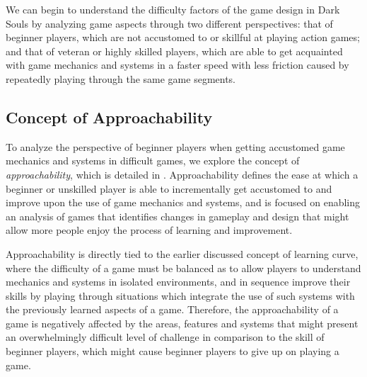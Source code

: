 We can begin to understand the difficulty factors of the game design in Dark Souls by analyzing game aspects through two different perspectives: that of beginner players, which are not accustomed to or skillful at playing action games; and that of veteran or highly skilled players, which are able to get acquainted with game mechanics and systems in a faster speed with less friction caused by repeatedly playing through the same game segments.

\subsection{Concept of Approachability}

To analyze the perspective of beginner players when getting accustomed game mechanics and systems in difficult games, we explore the concept of \emph{approachability}, which is detailed in \cite{ONLINE_AcessibilityInGameDesign}. Approachability defines the ease at which a beginner or unskilled player is able to incrementally get accustomed to and improve upon the use of game mechanics and systems, and is focused on enabling an analysis of games that identifies changes in gameplay and design that might allow more people enjoy the process of learning and improvement.

Approachability is directly tied to the earlier discussed concept of learning curve, where the difficulty of a game must be balanced as to allow players to understand mechanics and systems in isolated environments, and in sequence improve their skills by playing through situations which integrate the use of such systems with the previously learned aspects of a game. Therefore, the approachability of a game is negatively affected by the areas, features and systems that might present an overwhelmingly difficult level of challenge in comparison to the skill of beginner players, which might cause beginner players to give up on playing a game.

